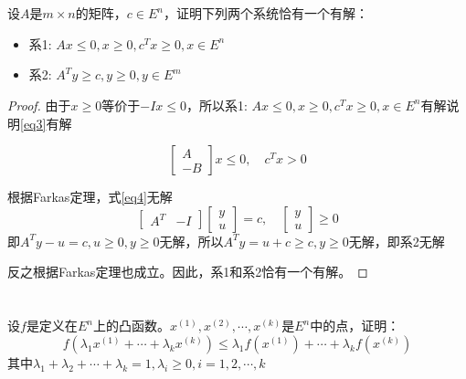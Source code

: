 \documentclass[a4paper]{article}
\begin{document}
\section{}
设$A$是$m\times n$的矩阵，$c\in E^n$，证明下列两个系统恰有一个有解：
\begin{itemize}
	\item 系1: $Ax\le 0,x\ge 0, c^Tx\ge 0,x\in E^n$
	\item 系2: $A^Ty\ge c,y\ge 0,y\in E^m$
\end{itemize}
\begin{proof}
	由于$x\ge 0$等价于$-Ix\le 0$，所以系1: $Ax\le 0,x\ge 0, c^Tx\ge 0,x\in E^n$有解说明\ref{eq3}有解
	
	\begin{equation}
	\label{eq3}
	\left[
	\begin{array}{c}
	A \\
	-B
	\end{array}
	\right]
	x \le 0,\quad c^Tx>0
	\end{equation}

根据Farkas定理，式\ref{eq4}无解
\begin{equation}
\label{eq4}
\left[
\begin{array}{cc}
A^T & -I
\end{array}
\right]
\left[
\begin{array}{c}
y \\
u 
\end{array}
\right]
=c,\quad
\left[
\begin{array}{c}
y \\
u 
\end{array}
\right]
\ge 0
\end{equation}
即$A^Ty-u=c,u\ge 0, y\ge 0$无解，所以$A^Ty=u+c\ge c, y\ge 0$无解，即系2无解

反之根据Farkas定理也成立。因此，系1和系2恰有一个有解。
\end{proof}

\section{}
设$f$是定义在$E^n$上的凸函数。$x^{(1)},x^{(2)},\cdots,x^{(k)}$是$E^n$中的点，证明：
\begin{equation}
\label{eq5}
f(\lambda_1x^{(1)}+\cdots+\lambda_kx^{(k)})\le \lambda_1f(x^{(1)})+\cdots+\lambda_kf(x^{(k)})
\end{equation}
其中$\lambda_1+\lambda_2+\cdots+\lambda_k=1,\lambda_i\ge 0,i=1,2,\cdots,k$
\end{document}
